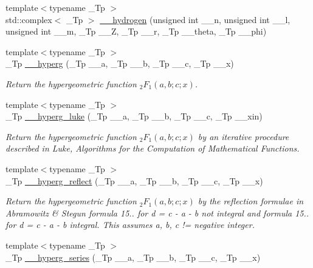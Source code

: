 \begin{DoxyCompactItemize}
{\footnotesize template$<$typename \+\_\+\+Tp $>$ }\\std\+::complex$<$ \+\_\+\+Tp $>$ \hyperlink{namespacestd_1_1____detail_aba60bcf9f002dc900042065999546bc9}{\+\_\+\+\_\+hydrogen} (unsigned int \+\_\+\+\_\+n, unsigned int \+\_\+\+\_\+l, unsigned int \+\_\+\+\_\+m, \+\_\+\+Tp \+\_\+\+\_\+Z, \+\_\+\+Tp \+\_\+\+\_\+r, \+\_\+\+Tp \+\_\+\+\_\+theta, \+\_\+\+Tp \+\_\+\+\_\+phi)
\item 
{\footnotesize template$<$typename \+\_\+\+Tp $>$ }\\\+\_\+\+Tp \hyperlink{namespacestd_1_1____detail_a316589a60d5e5f50201c2d42b980678c}{\+\_\+\+\_\+hyperg} (\+\_\+\+Tp \+\_\+\+\_\+a, \+\_\+\+Tp \+\_\+\+\_\+b, \+\_\+\+Tp \+\_\+\+\_\+c, \+\_\+\+Tp \+\_\+\+\_\+x)
\begin{DoxyCompactList}\small\item\em Return the hypergeometric function $ _2F_1(a,b;c;x) $. \end{DoxyCompactList}\item 
{\footnotesize template$<$typename \+\_\+\+Tp $>$ }\\\+\_\+\+Tp \hyperlink{namespacestd_1_1____detail_a0c1ec62b5c39c93ad70a8229a7a6d84d}{\+\_\+\+\_\+hyperg\+\_\+luke} (\+\_\+\+Tp \+\_\+\+\_\+a, \+\_\+\+Tp \+\_\+\+\_\+b, \+\_\+\+Tp \+\_\+\+\_\+c, \+\_\+\+Tp \+\_\+\+\_\+xin)
\begin{DoxyCompactList}\small\item\em Return the hypergeometric function $ _2F_1(a,b;c;x) $ by an iterative procedure described in Luke, Algorithms for the Computation of Mathematical Functions. \end{DoxyCompactList}\item 
{\footnotesize template$<$typename \+\_\+\+Tp $>$ }\\\+\_\+\+Tp \hyperlink{namespacestd_1_1____detail_a3c3baddc93bfaf1cb368d4b74e53542d}{\+\_\+\+\_\+hyperg\+\_\+reflect} (\+\_\+\+Tp \+\_\+\+\_\+a, \+\_\+\+Tp \+\_\+\+\_\+b, \+\_\+\+Tp \+\_\+\+\_\+c, \+\_\+\+Tp \+\_\+\+\_\+x)
\begin{DoxyCompactList}\small\item\em Return the hypergeometric function $ _2F_1(a,b;c;x) $ by the reflection formulae in Abramowitz \& Stegun formula 15.. for d = c -\/ a -\/ b not integral and formula 15.. for d = c -\/ a -\/ b integral. This assumes a, b, c != negative integer. \end{DoxyCompactList}\item 
{\footnotesize template$<$typename \+\_\+\+Tp $>$ }\\\+\_\+\+Tp \hyperlink{namespacestd_1_1____detail_ad234e0d31f55cd3748169dccb2533c6a}{\+\_\+\+\_\+hyperg\+\_\+series} (\+\_\+\+Tp \+\_\+\+\_\+a, \+\_\+\+Tp \+\_\+\+\_\+b, \+\_\+\+Tp \+\_\+\+\_\+c, \+\_\+\+Tp \+\_\+\+\_\+x)

\end{DoxyCompactItemize}
